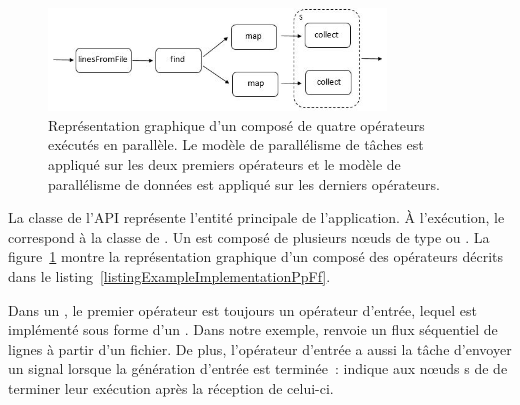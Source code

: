 


\begin{figure}[ht]
\centering
     \includegraphics[width=0.8\textwidth]{Figures/ExempleRuntimeExecution.jpg}
      \caption[Repr\'esentation graphique d'un  compos\'e de quatre op\'erateurs.]{Repr\'esentation graphique d'un  compos\'e de quatre op\'erateurs ex\'ecut\'es en parall\`ele. Le mod\`ele de parall\'elisme de t\^aches est appliqu\'e sur les deux premiers op\'erateurs et le mod\`ele de parall\'elisme de donn\'ees est appliqu\'e sur les derniers op\'erateurs.}
       \label{ExempleRuntimeExecution.fig}
\end{figure}



La classe  de l'API repr\'esente l'entit\'e principale de l'application. \`A l'ex\'ecution, le  correspond \`a la classe  de . Un  est compos\'e de plusieurs nœuds de type  ou . La figure~\ref{ExempleRuntimeExecution.fig} montre la repr\'esentation graphique d'un  compos\'e des op\'erateurs d\'ecrits dans le listing~\ref{listingExampleImplementationPpFf}.
 
Dans un , le premier op\'erateur est toujours un op\'erateur d'entr\'ee, lequel est impl\'ement\'e sous forme d'un . Dans notre exemple,  renvoie un flux s\'equentiel de lignes \`a partir d'un fichier. De plus, l'op\'erateur d'entr\'ee a aussi la t\^ache d'envoyer un signal  lorsque la g\'en\'eration d'entr\'ee est termin\'ee~:  indique aux nœuds s de  de terminer leur ex\'ecution apr\`es la r\'eception de celui-ci.

